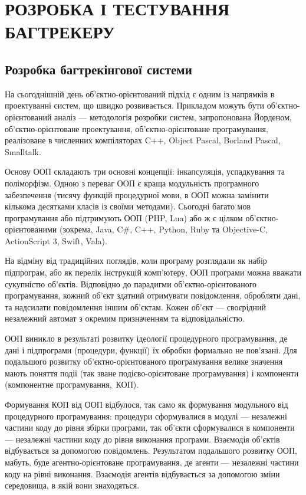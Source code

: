 \documentclass[../main.tex]{subfiles}
\begin{document}
\chapter{РОЗРОБКА І ТЕСТУВАННЯ БАГТРЕКЕРУ}

\section{Розробка багтрекінгової системи}

	На сьогоднішній день об'єктно-\linebreak[0]орієнтований підхід є одним із напрямків в проектуванні систем, що швидко розвивається. Прикладом можуть бути об'єктно-\linebreak[0]орієнтований аналіз — методологія розробки систем, запропонована Йорденом, об'єктно-орієнтоване проектування, об'єктно-\linebreak[0]орієнтоване програмування, реалізоване в численних компіляторах C++, Object Pascal, Borland Pascal, Smalltalk.
	
	Основу ООП складають три основні концепції: інкапсуляція, успадкування та поліморфізм. Одною з переваг ООП є краща модульність програмного забезпечення (тисячу функцій процедурної мови, в ООП можна замінити кількома десятками класів із своїми методами). Сьогодні багато мов програмування або підтримують ООП (PHP, Lua) або ж є цілком об'єктно-орієнтованими (зокрема, Java, C\#, C++, Python, Ruby та Objective-C, ActionScript 3, Swift, Vala).~\cite{oo_thought_process}
	
	На відміну від традиційних поглядів, коли програму розглядали як набір підпрограм, або як перелік інструкцій комп'ютеру, ООП програми можна вважати сукупністю об'єктів. Відповідно до парадигми об'єктно-\linebreak[0]орієнтованого програмування, кожний об'єкт здатний отримувати повідомлення, обробляти дані, та надсилати повідомлення іншим об'єктам. Кожен об'єкт — своєрідний незалежний автомат з окремим призначенням та відповідальністю.~\cite{object_oriented_analysis}
	
	ООП виникло в результаті розвитку ідеології процедурного програмування, де дані і підпрограми (процедури, функції) їх обробки формально не пов'язані. Для подальшого розвитку об'єктно-орієнтованого програмування велике значення мають поняття події (так зване подієво-орієнтоване програмування) і компоненти (компонентне програмування,~КОП).~\cite{oo_methods}
	
	Формування КОП від ООП відбулося, так само як формування модульного від процедурного програмування: процедури сформувалися в модулі — незалежні частини коду до рівня збірки програми, так об'єкти сформувалися в компоненти — незалежні частини коду до рівня виконання програми. Взаємодія об'єктів відбувається за допомогою повідомлень. Результатом подальшого розвитку ООП, мабуть, буде агентно-орієнтоване програмування, де агенти — незалежні частини коду на рівні виконання. Взаємодія агентів відбувається за допомогою зміни середовища, в якій вони знаходяться.
	
\end{document}
